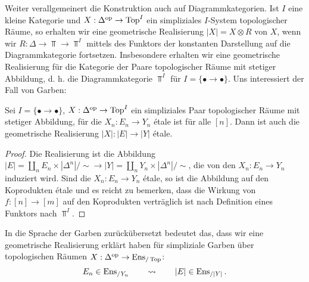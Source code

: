 Weiter verallgemeinert die Konstruktion auch auf
Diagrammkategorien. Ist $I$ eine kleine Kategorie und $X: \Delta^\mathrm{op}
\to \operatorname{Top}^I$ ein simpliziales $I$-System topologischer Räume, so
erhalten wir eine geometrische Realisierung $|X| = X \otimes R$ von
$X$, wenn wir $R: \Delta \to \Top \to \Top^I$ mittels des Funktors der
konstanten Darstellung auf die Diagrammkategorie
fortsetzen. Insbesondere erhalten wir eine geometrische Realisierung
für die Kategorie der Paare topologischer Räume mit stetiger
Abbildung, d. h. die Diagrammkategorie $\Top^I$ für $I = \{ \bullet
\to \bullet \}$. Uns interessiert der Fall von Garben:
\begin{satz}
  Sei $I = \{ \bullet \to \bullet \}$, $X: \Delta^\mathrm{op} \to \operatorname{Top}^I$ ein
  simpliziales Paar topologischer Räume mit stetiger Abbildung, für
  die $X_n: E_n \to Y_n$ étale ist für alle $[n]$. Dann ist auch die
  geometrische Realisierung $|X|: |E| \to |Y|$ étale.
\end{satz}
\begin{proof}
  Die Realisierung ist die Abbildung $|E| = \coprod_n E_n \times
  |\Delta^n| / \sim \to |Y| = \coprod_n Y_n \times |\Delta^n| / \sim$,
  die von den $X_n: E_n \to Y_n$ induziert wird. Sind die $X_n: E_n
  \to Y_n$ étale, so ist die Abbildung auf den Koprodukten étale und
  es reicht zu bemerken, dass die Wirkung von $f: [n] \to [m]$ auf den
  Koprodukten verträglich ist nach Definition eines Funktors nach
  $\Top^I$.
\end{proof}
In die Sprache der Garben zurückübersetzt bedeutet das, dass wir eine
geometrische Realisierung erklärt haben für simpliziale Garben über
topologischen Räumen $X: \Delta^\mathrm{op} \to \operatorname{Ens}_{/\operatorname{Top}}$:
\[ E_n \in \operatorname{Ens}_{/Y_n} \qquad \rightsquigarrow \qquad |E| \in \operatorname{Ens}_{/|Y|} . \]



